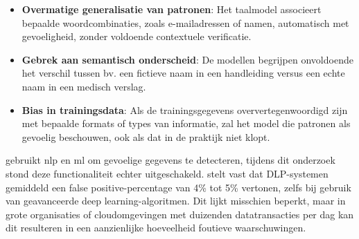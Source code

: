 \begin{itemize}
    \item \textbf{Overmatige generalisatie van patronen}: Het taalmodel associeert bepaalde woordcombinaties, zoals e-mailadressen of namen, automatisch met gevoeligheid, zonder voldoende contextuele verificatie.
    \item \textbf{Gebrek aan semantisch onderscheid}: De modellen begrijpen onvoldoende het verschil tussen bv. een fictieve naam in een handleiding versus een echte naam in een medisch verslag.
   \item \textbf{Bias in trainingsdata}: Als de trainingsgegevens oververtegenwoordigd zijn met bepaalde formats of types van informatie, zal het model die patronen als gevoelig beschouwen, ook als dat in de praktijk niet klopt.
\end{itemize}

\textcite{Netskope2023AI} gebruikt \gls{nlp} en \gls{ml} om gevoelige gegevens te detecteren, tijdens dit onderzoek stond deze functionaliteit echter uitgeschakeld.
\textcite{Olateju2024} stelt vast dat DLP-systemen gemiddeld een false positive-percentage van 4\% tot 5\% vertonen, zelfs bij gebruik van geavanceerde deep learning-algoritmen.
Dit lijkt misschien beperkt, maar in grote organisaties of cloudomgevingen met duizenden datatransacties per dag kan dit resulteren in een aanzienlijke hoeveelheid foutieve waarschuwingen.







